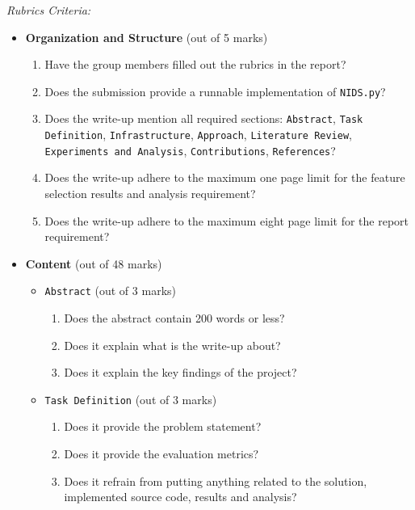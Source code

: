 \textit{Rubrics Criteria:}
\begin{itemize}
    \item \textbf{Organization and Structure} (out of 5 marks)
    \begin{enumerate}
        \item Have the group members filled out the rubrics in the report?
            \answerTODO{}
        \item Does the submission provide a runnable implementation of \texttt{NIDS.py}?
            \answerTODO{}
        \item Does the write-up mention all required sections: \texttt{Abstract}, \texttt{Task Definition}, \texttt{Infrastructure}, \texttt{Approach}, \texttt{Literature Review}, \texttt{Experiments and Analysis}, \texttt{Contributions}, \texttt{References}?
            \answerTODO{}
        \item Does the write-up adhere to the maximum one page limit for the feature selection results and analysis requirement?
            \answerTODO{}
        \item Does the write-up adhere to the maximum eight page limit for the report requirement?
            \answerTODO{}
    \end{enumerate}
    \item \textbf{Content} (out of 48 marks)
    \begin{itemize}
        \item \texttt{Abstract} (out of 3 marks)
        \begin{enumerate}
            \item Does the abstract contain 200 words or less?
                \answerTODO{}
            \item Does it explain what is the write-up about?
                \answerTODO{}
            \item Does it explain the key findings of the project?
                \answerTODO{}
        \end{enumerate}
        \item \texttt{Task Definition} (out of 3 marks)
        \begin{enumerate}
            \item Does it provide the problem statement?
                \answerTODO{}
            \item Does it provide the evaluation metrics?
                \answerTODO{}
            \item Does it refrain from putting anything related to the solution, implemented source code, results and analysis?

\end{enumerate}
\end{itemize}
\end{itemize}
